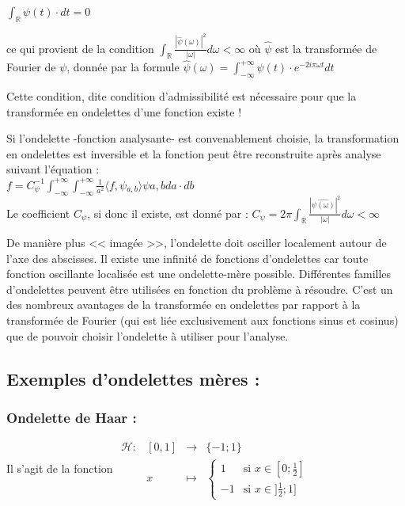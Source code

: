 \documentclass{article}
\begin{document}
$\int_{\mathbb{R}}\psi{}(t)\cdot{}dt = 0$

ce qui provient de la condition $\int_{\mathbb{R}} \frac{|\hat{\psi}(\omega)|^2}{|\omega|}d\omega < \infty$ où $\hat{\psi}$ est la transformée de Fourier de $\psi$, donnée par la formule $\displaystyle \hat{\psi}(\omega)= \int_{-\infty}^{+\infty}\psi{}(t)\cdot{}e^{-2i\pi\omega{}t}dt$

Cette condition, dite condition d’admissibilité est nécessaire pour que la transformée en ondelettes d’une fonction existe !

Si l'ondelette -fonction analysante- est convenablement choisie, la transformation en ondelettes est inversible et la fonction peut être reconstruite après analyse suivant l'équation : \\

$\displaystyle f = C_{\psi}^{-1}\int_{-\infty}^{+\infty}\int_{-\infty}^{+\infty}\frac{1}{a^2}\langle{}f,\psi{}_{a,b}\rangle\psi{a,b}da\cdot{}db$ \\


Le coefficient $C_{\psi}$, si donc il existe, est donné par : $\displaystyle C_{\psi} = 2\pi\int_{\mathbb{R}}\frac{|\hat{\psi{}(\omega)}|^2}{|\omega|}d\omega < \infty$


De manière plus << imagée >>, l’ondelette doit osciller localement autour de l’axe des abscisses.
Il existe une infinité de fonctions d’ondelettes car toute fonction oscillante localisée est une ondelette-mère possible.
Différentes familles d’ondelettes peuvent être utilisées en fonction du problème à résoudre. C’est un des nombreux avantages de la transformée en ondelettes par rapport à la transformée de Fourier (qui est liée exclusivement aux fonctions sinus et cosinus) que de pouvoir choisir l’ondelette à utiliser pour l’analyse.


\subsection{Exemples d’ondelettes mères :}

\subsubsection{Ondelette de Haar :}

Il s'agit de la fonction $\begin{array}{lrcl}
\mathcal{H} : & [0,1] & \longrightarrow & \{-1;1\} \\
    & x & \longmapsto & \begin{cases}
   1 & \text{si } x \in [0;\frac{1}{2}] \\
   -1       & \text{si } x \in ]\frac{1}{2};1]
  \end{cases} \end{array}$
  
\end{document}
